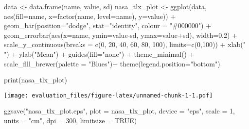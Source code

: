\documentclass[
]{article}
\newenvironment{Shaded}{\begin{snugshade}}{\end{snugshade}}
\newcommand{\AttributeTok}[1]{\textcolor[rgb]{0.77,0.63,0.00}{#1}}
\newcommand{\ConstantTok}[1]{\textcolor[rgb]{0.00,0.00,0.00}{#1}}
\newcommand{\DecValTok}[1]{\textcolor[rgb]{0.00,0.00,0.81}{#1}}
\newcommand{\FloatTok}[1]{\textcolor[rgb]{0.00,0.00,0.81}{#1}}
\newcommand{\FunctionTok}[1]{\textcolor[rgb]{0.00,0.00,0.00}{#1}}
\newcommand{\NormalTok}[1]{#1}
\newcommand{\OtherTok}[1]{\textcolor[rgb]{0.56,0.35,0.01}{#1}}
\newcommand{\SpecialCharTok}[1]{\textcolor[rgb]{0.00,0.00,0.00}{#1}}
\newcommand{\StringTok}[1]{\textcolor[rgb]{0.31,0.60,0.02}{#1}}
\begin{document}
\begin{Shaded}
\begin{Highlighting}[]
\NormalTok{data }\OtherTok{\textless{}{-}} \FunctionTok{data.frame}\NormalTok{(name, value, sd)}
\NormalTok{nasa\_tlx\_plot }\OtherTok{\textless{}{-}} \FunctionTok{ggplot}\NormalTok{(data, }\FunctionTok{aes}\NormalTok{(}\AttributeTok{fill=}\NormalTok{name, }\AttributeTok{x=}\FunctionTok{factor}\NormalTok{(name, }\AttributeTok{level=}\NormalTok{name), }\AttributeTok{y=}\NormalTok{value)) }\SpecialCharTok{+} 
  \FunctionTok{geom\_bar}\NormalTok{(}\AttributeTok{position=}\StringTok{"dodge"}\NormalTok{, }\AttributeTok{stat=}\StringTok{"identity"}\NormalTok{, }\AttributeTok{colour =} \StringTok{"\#000000"}\NormalTok{) }\SpecialCharTok{+} 
  \FunctionTok{geom\_errorbar}\NormalTok{(}\FunctionTok{aes}\NormalTok{(}\AttributeTok{x=}\NormalTok{name, }\AttributeTok{ymin=}\NormalTok{value}\SpecialCharTok{{-}}\NormalTok{sd, }\AttributeTok{ymax=}\NormalTok{value}\SpecialCharTok{+}\NormalTok{sd), }\AttributeTok{width=}\FloatTok{0.2}\NormalTok{) }\SpecialCharTok{+} 
  \FunctionTok{scale\_y\_continuous}\NormalTok{(}\AttributeTok{breaks =} \FunctionTok{c}\NormalTok{(}\DecValTok{0}\NormalTok{, }\DecValTok{20}\NormalTok{, }\DecValTok{40}\NormalTok{, }\DecValTok{60}\NormalTok{, }\DecValTok{80}\NormalTok{, }\DecValTok{100}\NormalTok{), }\AttributeTok{limits=}\FunctionTok{c}\NormalTok{(}\DecValTok{0}\NormalTok{,}\DecValTok{100}\NormalTok{)) }\SpecialCharTok{+}
  \FunctionTok{xlab}\NormalTok{(}\StringTok{" "}\NormalTok{) }\SpecialCharTok{+} \FunctionTok{ylab}\NormalTok{(}\StringTok{"Mean"}\NormalTok{) }\SpecialCharTok{+}
  \FunctionTok{guides}\NormalTok{(}\AttributeTok{fill=}\StringTok{"none"}\NormalTok{) }\SpecialCharTok{+}
  \FunctionTok{theme\_minimal}\NormalTok{() }\SpecialCharTok{+}
  \FunctionTok{scale\_fill\_brewer}\NormalTok{(}\AttributeTok{palette =} \StringTok{"Blues"}\NormalTok{)}\SpecialCharTok{+}
  \FunctionTok{theme}\NormalTok{(}\AttributeTok{legend.position=}\StringTok{"bottom"}\NormalTok{)}

\FunctionTok{print}\NormalTok{(nasa\_tlx\_plot)}
\end{Highlighting}
\end{Shaded}

\texttt{[image: evaluation\_files/figure-latex/unnamed-chunk-1-1.pdf]}

\begin{Shaded}
\begin{Highlighting}[]
\FunctionTok{ggsave}\NormalTok{(}\StringTok{"nasa\_tlx\_plot.eps"}\NormalTok{,}
       \AttributeTok{plot =}\NormalTok{ nasa\_tlx\_plot,}
       \AttributeTok{device =} \StringTok{"eps"}\NormalTok{,}
       \AttributeTok{scale =} \DecValTok{1}\NormalTok{, }\AttributeTok{units =} \StringTok{"cm"}\NormalTok{,}
       \AttributeTok{dpi =} \DecValTok{300}\NormalTok{,}
       \AttributeTok{limitsize =} \ConstantTok{TRUE}\NormalTok{)}
\end{Highlighting}
\end{Shaded}
\end{document}
